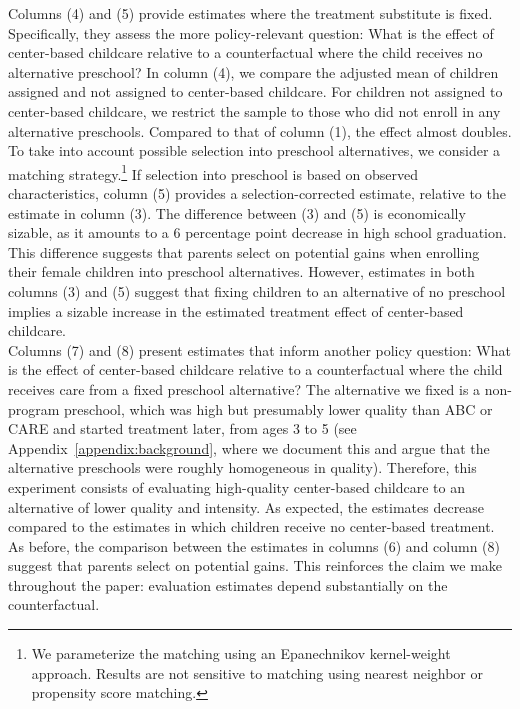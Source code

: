 \noindent Columns (4) and (5) provide estimates where the treatment substitute is fixed. Specifically, they assess the more policy-relevant question: What is the effect of center-based childcare relative to a counterfactual where the child receives no alternative preschool? In column (4), we compare the adjusted mean of children assigned and not assigned to center-based childcare. For children not assigned to center-based childcare, we restrict the sample to those who did not enroll in any alternative preschools. Compared to that of column (1), the effect almost doubles. To take into account possible selection into preschool alternatives, we consider a matching strategy.\footnote{We parameterize the matching using an Epanechnikov kernel-weight approach. Results are not sensitive to matching using nearest neighbor or propensity score matching.} If selection into preschool is based on observed characteristics, column (5) provides a selection-corrected estimate, relative to the estimate in column (3). The difference between (3) and (5) is economically sizable, as it amounts to a 6 percentage point decrease in high school graduation. This difference suggests that parents select on potential gains when enrolling their female children into preschool alternatives. However, estimates in both columns (3) and (5) suggest that fixing children to an alternative of no preschool implies a sizable increase in the estimated treatment effect of center-based childcare. \\

\noindent Columns (7) and (8) present estimates that inform another policy question: What is the effect of center-based childcare relative to a counterfactual where the child receives care from a fixed preschool alternative? The alternative we fixed is a non-program preschool, which was high but  presumably lower quality than ABC or CARE and started treatment later, from ages 3 to 5 (see Appendix~\ref{appendix:background}, where we document this and argue that the alternative preschools were roughly homogeneous in quality). Therefore, this experiment consists of evaluating high-quality center-based childcare to an alternative of lower quality and intensity. As expected, the estimates decrease compared to the estimates in which children receive no center-based treatment. As before, the comparison between the estimates in columns (6) and column (8) suggest that parents select on potential gains. This reinforces the claim we make throughout the paper: evaluation estimates depend substantially on the counterfactual.\\

